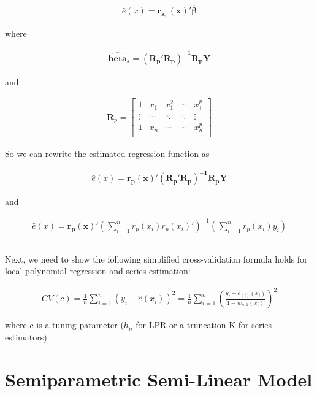 \documentclass[12pt]{article}
\begin{document}
\begin{gather*}
\hat{e}(x) = \mathbf{r_{k_n}(x)'\hat{\beta}}
\end{gather*}

where

\begin{gather*}
\mathbf{\hat{beta}_s} = \mathbf{\left( R_p'R_p \right)^{-1}R_pY}
\end{gather*}

and

\begin{gather*}
\mathbf{R}_p = \begin{bmatrix}
1 & x_1 & x_1^2 & \cdots & x_1^p \\
\vdots & \cdots & \ddots & \ddots & \vdots \\
1 & x_n & \cdots & \cdots & x_n^p \\
\end{bmatrix}
\end{gather*}

So we can rewrite the estimated regression function as

\begin{gather*}
\hat{e}(x) = \mathbf{r_p(x)'\left( R_p'R_p \right)^{-1}R_pY}
\end{gather*}

and

\begin{gather*}
\hat{e}(x) = \mathbf{r_p(x)'} \left(\sum\limits_{i=1}^n r_p(x_i)r_p(x_i)'\right)^{-1} \left( \sum\limits_{i=1}^n r_p(x_i)y_i\right)
\end{gather*}


\subsection{}

Next, we need to show the following simplified cross-validation formula holds for local polynomial regression and series estimation:

\begin{gather*}
CV(c) = \frac{1}{n} \sum\limits_{i=1}^n (y_i - \hat{e}(x_i))^2  =  \frac{1}{n} \sum\limits_{i=1}^n \left( \frac{y_i - \hat{e}_{(i)}(x_i)} {1-w_{n,1}(x_i)} \right)^2
\end{gather*}

where c is a tuning parameter ($h_n$ for LPR or a truncation K for series estimators)






\newpage
\section{Semiparametric Semi-Linear Model}
\end{document}

